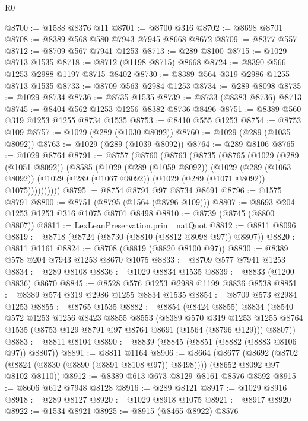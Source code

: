 \begin{lexlean}{R0}
\begin{coremodule}
@8700 := @1588 @8376 @11
@8701 := @8700 @316
@8702 := @8698 @8701
@8708 := @8389 @568 @580 @7943 @7945 @8668 @8672
@8709 := @8377 @557
@8712 := @8709 @567 @7941 @1253
@8713 := @289 @8100
@8715 := @1029 @8713 @1535
@8718 := @8712 (@1198 @8715) @8668
@8724 := @8390 @566 @1253 @2988 @1197 @8715 @8402
@8730 := @8389 @564 @319 @2986 @1255 @8713 @1535
@8733 := @8709 @563 @2984 @1253
@8734 := @289 @8098
@8735 := @1029 @8734
@8736 := @8735 @1535
@8739 := @8733 (@8383 @8736) @8713
@8745 := @8404 @562 @1253 @1256 @8382 @8736 @8496
@8751 := @8389 @560 @319 @1253 @1255 @8734 @1535
@8753 := @8410 @555 @1253
@8754 := @8753 @109
@8757 := @1029 (@289 (@1030 @8092))
@8760 := @1029 (@289 (@1035 @8092))
@8763 := @1029 (@289 (@1039 @8092))
@8764 := @289 @8106
@8765 := @1029 @8764
@8791 := @8757
    (@8760
      (@8763
        (@8735
          (@8765
            (@1029
              (@289 (@1051 @8092))
              (@8585
                (@1029
                  (@289 (@1059 @8092))
                  (@1029
                    (@289 (@1063 @8092))
                    (@1029 (@289 (@1067 @8092)) (@1029 (@289 (@1071 @8092)) @1075))))))))))
@8795 := @8754 @8791 @97 @8734 @8691
@8796 := @1575 @8791
@8800 := @8751 (@8795 (@1564 (@8796 @109)))
@8807 := @8693 @204 @1253 @1253 @316 @1075 @8701 @8498
@8810 := @8739 (@8745 (@8800 @8807))
@8811 := LexLeanPreservation.prim_natQuot
@8812 := @8811 @8096
@8819 := @8718 (@8724 (@8730 (@8810 (@8812 @8098 @97)) @8807))
@8820 := @8811 @1161
@8824 := @8708 (@8819 (@8820 @8100 @97))
@8830 := @8389 @578 @204 @7943 @1253 @8670 @1075
@8833 := @8709 @577 @7941 @1253
@8834 := @289 @8108
@8836 := @1029 @8834 @1535
@8839 := @8833 (@1200 @8836) @8670
@8845 := @8528 @576 @1253 @2988 @1199 @8836 @8538
@8851 := @8389 @574 @319 @2986 @1255 @8834 @1535
@8854 := @8709 @573 @2984 @1253
@8855 := @8765 @1535
@8882 := @8854
    (@8424 @8855)
    @8834
    (@8540
      @572
      @1253
      @1256
      @8423
      @8855
      @8553
      (@8389
        @570
        @319
        @1253
        @1255
        @8764
        @1535
        (@8753 @129 @8791 @97 @8764 @8691 (@1564 (@8796 @129)))
        @8807))
@8883 := @8811 @8104
@8890 := @8839 (@8845 (@8851 (@8882 (@8883 @8106 @97)) @8807))
@8891 := @8811 @1164
@8906 := @8664
    (@8677
      (@8692 (@8702 (@8824 (@8830 (@8890 (@8891 @8108 @97)) @8498))))
      (@8652 @8092 @97 @8102 @8110))
@8912 := @8389 @613 @673 @8129 @8161 @8576 @8592
@8915 := @8606 @612 @7948 @8128
@8916 := @289 @8121
@8917 := @1029 @8916
@8918 := @289 @8127
@8920 := @1029 @8918 @1075
@8921 := @8917 @8920
@8922 := @1534 @8921
@8925 := @8915 (@8465 @8922) @8576

\end{coremodule}
\end{lexlean}
